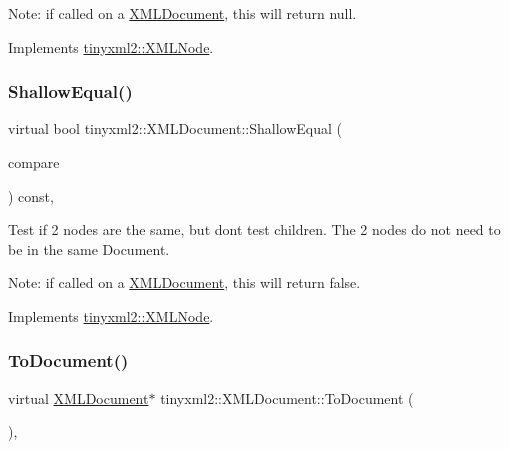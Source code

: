 Note\+: if called on a \hyperlink{classtinyxml2_1_1_x_m_l_document}{X\+M\+L\+Document}, this will return null. 

Implements \hyperlink{classtinyxml2_1_1_x_m_l_node_a8402cbd3129d20e9e6024bbcc0531283}{tinyxml2\+::\+X\+M\+L\+Node}.

\mbox{\label{classtinyxml2_1_1_x_m_l_document_a6fe5ef18699091844fcf64b56ffa5bf9}} 
\subsubsection{\texorpdfstring{Shallow\+Equal()}{ShallowEqual()}}
{\footnotesize\ttfamily virtual bool tinyxml2\+::\+X\+M\+L\+Document\+::\+Shallow\+Equal (\begin{DoxyParamCaption}\item[{const \hyperlink{classtinyxml2_1_1_x_m_l_node}{X\+M\+L\+Node} $\ast$}]{compare }\end{DoxyParamCaption}) const\hspace{0.3cm}{\ttfamily [inline]}, {\ttfamily [virtual]}}

Test if 2 nodes are the same, but don\textquotesingle{}t test children. The 2 nodes do not need to be in the same Document.

Note\+: if called on a \hyperlink{classtinyxml2_1_1_x_m_l_document}{X\+M\+L\+Document}, this will return false. 

Implements \hyperlink{classtinyxml2_1_1_x_m_l_node_a7ce18b751c3ea09eac292dca264f9226}{tinyxml2\+::\+X\+M\+L\+Node}.

\mbox{\label{classtinyxml2_1_1_x_m_l_document_a3e185f880882bd978367bb55937735ec}} 
\subsubsection{\texorpdfstring{To\+Document()}{ToDocument()}\hspace{0.1cm}{\footnotesize\ttfamily [1/2]}}
{\footnotesize\ttfamily virtual \hyperlink{classtinyxml2_1_1_x_m_l_document}{X\+M\+L\+Document}$\ast$ tinyxml2\+::\+X\+M\+L\+Document\+::\+To\+Document (\begin{DoxyParamCaption}{ }\end{DoxyParamCaption})\hspace{0.3cm}{\ttfamily [inline]}, {\ttfamily [virtual]}}



